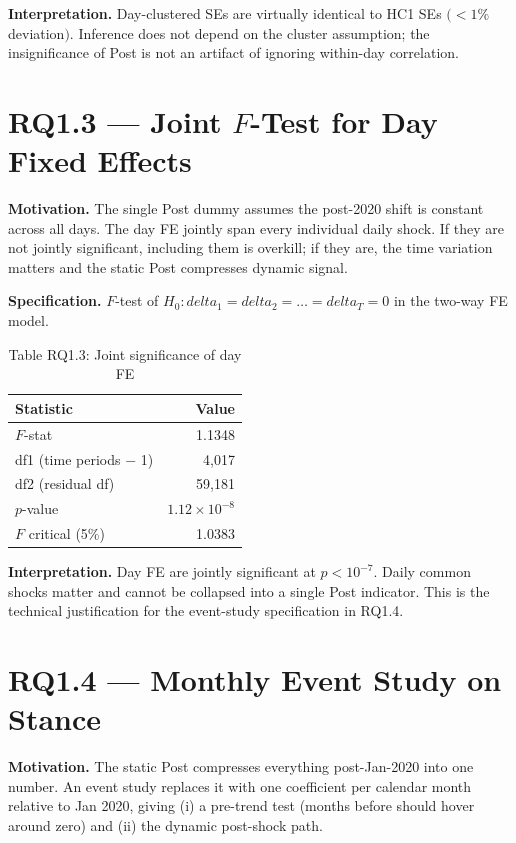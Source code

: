 \documentclass[11pt]{article}
\def\delta{delta}%
\begin{document}
\textbf{Interpretation.} Day-clustered SEs are virtually identical to HC1 SEs $(<1\%$ deviation$)$. Inference does not depend on the cluster assumption; the insignificance of Post is not an artifact of ignoring within-day correlation.

\section*{RQ1.3 --- Joint $F$-Test for Day Fixed Effects}\label{sec:rq1.3}
\textbf{Motivation.} The single Post dummy assumes the post-2020 shift is constant across all days. The day FE jointly span every individual daily shock. If they are not jointly significant, including them is overkill; if they are, the time variation matters and the static Post compresses dynamic signal.

\textbf{Specification.} $F$-test of $H_0: \delta_1 = \delta_2 = \dots = \delta_T = 0$ in the two-way FE model.

\begin{table}[H]
\centering
\caption*{Table RQ1.3: Joint significance of day FE}
\begin{tabular}{lr}
\toprule
Statistic & Value \\
\midrule
$F$-stat & 1.1348 \\
df1 (time periods $-$ 1) & 4{,}017 \\
df2 (residual df) & 59{,}181 \\
$p$-value & $1.12 \times 10^{-8}$ \\
$F$ critical (5\%) & 1.0383 \\
\bottomrule
\end{tabular}
\end{table}

\textbf{Interpretation.} Day FE are jointly significant at $p < 10^{-7}$. Daily common shocks matter and cannot be collapsed into a single Post indicator. This is the technical justification for the event-study specification in RQ1.4.

\section*{RQ1.4 --- Monthly Event Study on Stance}\label{sec:rq1.4}
\textbf{Motivation.} The static Post compresses everything post-Jan-2020 into one number. An event study replaces it with one coefficient per calendar month relative to Jan 2020, giving (i) a pre-trend test (months before should hover around zero) and (ii) the dynamic post-shock path.
\end{document}
